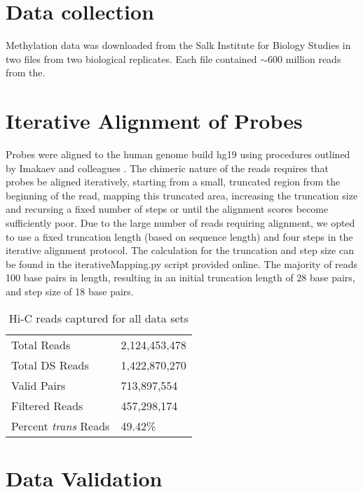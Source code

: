 
\chapter{Data collection}

Methylation data was downloaded from the Salk Institute for Biology Studies in
two files from two biological replicates.  Each file contained $\sim600$ million
reads from the.

\chapter{Iterative Alignment of Probes}

Probes were aligned to the human genome build hg19 using procedures outlined by Imakaev and colleagues \citep{imakaev2012}.  The chimeric nature of the reads
requires that probes be aligned iteratively, starting from a small, truncated region from the beginning of the read, mapping this truncated area, increasing
the truncation size and recursing a fixed number of steps or until the alignment scores become sufficiently poor.  Due to the large number of reads requiring
alignment, we opted to use a fixed truncation length (based on sequence length) and four steps in the iterative alignment protocol.  The calculation
for the truncation and step size can be found in the iterativeMapping.py script provided online.  The majority of reads 100 base pairs in length, resulting
in an initial truncation length of 28 base pairs, and step size of 18 base pairs.

\begin{table}[ht]
  \centering
  \caption{Hi-C reads captured for all data sets}
  \label{tab:reads}
  \begin{tabular}{l l}
    \toprule
    Total Reads                  & 2,124,453,478 \\
    Total DS Reads               & 1,422,870,270 \\
    Valid Pairs                  & 713,897,554 \\
    Filtered Reads               & 457,298,174 \\
    Percent \textit{trans} Reads & 49.42\% \\
    \bottomrule
  \end{tabular}
\end{table}


\chapter{Data Validation}

